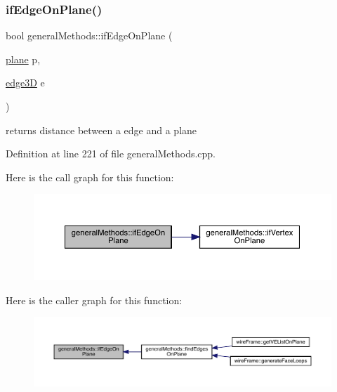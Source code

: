\subsubsection{\texorpdfstring{if\+Edge\+On\+Plane()}{ifEdgeOnPlane()}}
{\footnotesize\ttfamily bool general\+Methods\+::if\+Edge\+On\+Plane (\begin{DoxyParamCaption}\item[{\mbox{\hyperlink{structplane}{plane}}}]{p,  }\item[{\mbox{\hyperlink{structedge3_d}{edge3D}}}]{e }\end{DoxyParamCaption})}

returns distance between a edge and a plane 

Definition at line 221 of file general\+Methods.\+cpp.

Here is the call graph for this function\+:
\nopagebreak
\begin{figure}[H]
\begin{center}
\leavevmode
\includegraphics[width=350pt]{namespacegeneral_methods_a21d2e8c181e8cac3762d9ca1871d2168_cgraph}
\end{center}
\end{figure}
Here is the caller graph for this function\+:
\nopagebreak
\begin{figure}[H]
\begin{center}
\leavevmode
\includegraphics[width=350pt]{namespacegeneral_methods_a21d2e8c181e8cac3762d9ca1871d2168_icgraph}
\end{center}
\end{figure}
\mbox{\label{namespacegeneral_methods_a330682bb45234d8de5228a7607d493d2}} 
